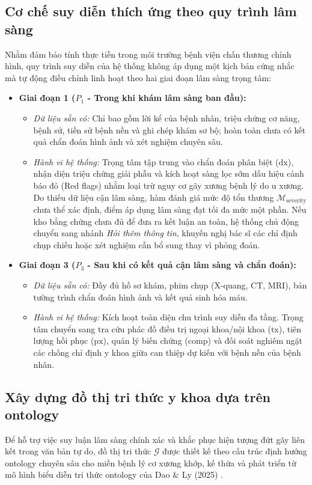 \subsection{Cơ chế suy diễn thích ứng theo quy trình lâm sàng}
Nhằm đảm bảo tính thực tiễn trong môi trường bệnh viện chấn thương chỉnh hình, quy trình suy diễn của hệ thống không áp dụng một kịch bản cứng nhắc mà tự động điều chỉnh linh hoạt theo hai giai đoạn lâm sàng trọng tâm:
\begin{itemize}
    \item \textbf{Giai đoạn 1 ($P_1$ - Trong khi khám lâm sàng ban đầu):}
    \begin{itemize}
        \item \emph{Dữ liệu sẵn có:} Chỉ bao gồm lời kể của bệnh nhân, triệu chứng cơ năng, bệnh sử, tiền sử bệnh nền và ghi chép khám sơ bộ; hoàn toàn chưa có kết quả chẩn đoán hình ảnh và xét nghiệm chuyên sâu.
        \item \emph{Hành vi hệ thống:} Trọng tâm tập trung vào chẩn đoán phân biệt ($\mathrm{dx}$), nhận diện triệu chứng giải phẫu và kích hoạt sàng lọc sớm dấu hiệu cảnh báo đỏ (Red flags) nhằm loại trừ nguy cơ gãy xương bệnh lý do u xương. Do thiếu dữ liệu cận lâm sàng, hàm đánh giá mức độ tổn thương $\mathcal{M}_{\mathrm{severity}}$ chưa thể xác định, điểm áp dụng lâm sàng đạt tối đa mức một phần. Nếu kho bằng chứng chưa đủ để đưa ra kết luận an toàn, hệ thống chủ động chuyển sang nhánh \emph{Hỏi thêm thông tin}, khuyến nghị bác sĩ các chỉ định chụp chiếu hoặc xét nghiệm cần bổ sung thay vì phỏng đoán.
    \end{itemize}

    \item \textbf{Giai đoạn 3 ($P_3$ - Sau khi có kết quả cận lâm sàng và chẩn đoán):}
    \begin{itemize}
        \item \emph{Dữ liệu sẵn có:} Đầy đủ hồ sơ khám, phim chụp (X-quang, CT, MRI), bản tường trình chẩn đoán hình ảnh và kết quả sinh hóa máu.
        \item \emph{Hành vi hệ thống:} Kích hoạt toàn diện chu trình suy diễn đa tầng. Trọng tâm chuyển sang tra cứu phác đồ điều trị ngoại khoa/nội khoa ($\mathrm{tx}$), tiên lượng hồi phục ($\mathrm{px}$), quản lý biến chứng ($\mathrm{comp}$) và đối soát nghiêm ngặt các chống chỉ định y khoa giữa can thiệp dự kiến với bệnh nền của bệnh nhân.
    \end{itemize}
\end{itemize}

\subsection{Xây dựng đồ thị tri thức y khoa dựa trên ontology}
Để hỗ trợ việc suy luận lâm sàng chính xác và khắc phục hiện tượng đứt gãy liên kết trong văn bản tự do, đồ thị tri thức $\mathcal{G}$ được thiết kế theo cấu trúc định hướng ontology chuyên sâu cho miền bệnh lý cơ xương khớp, kế thừa và phát triển từ mô hình biểu diễn tri thức ontology của Dao \& Ly (2025) \cite{dao2025ontology}.

